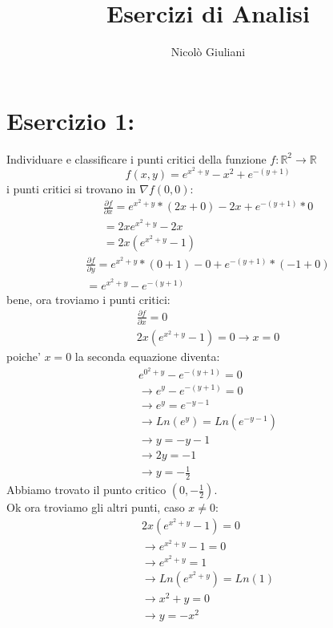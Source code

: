 \documentclass{article}
\title{Esercizi di Analisi}
\author{Nicolò Giuliani}
\date{}
\begin{document}
\maketitle
\section*{Esercizio 1:}
Individuare e classificare i punti critici della funzione $f : \mathbb{R}^2 \to \mathbb{R}$
\begin{equation*}
    f(x,y)=e^{x^2+y}-x^2+e^{-(y+1)}
\end{equation*}
i punti critici si trovano in $\nabla f(0,0)$:
\begin{align*}
    \frac{\partial f}{\partial x}=e^{x^2+y}*(2x+0)-2x+e^{-(y+1)}*0 \\
    = 2xe^{x^2+y}-2x \\
    = 2x(e^{x^2+y}-1)
\end{align*}
\begin{align*}
    \frac{\partial f}{\partial y}=e^{x^2+y}*(0+1)-0+e^{-(y+1)}*(-1+0) \\
    = e^{x^2+y} - e^{-(y+1)}
\end{align*}
bene, ora troviamo i punti critici:
\begin{align*}
    \frac{\partial f}{\partial x}=0 \\
    2x(e^{x^2+y}-1) = 0 \to x=0
\end{align*}
poiche' $x=0$ la seconda equazione diventa:
\begin{align*}
    e^{0^2+y} - e^{-(y+1)}=0 \\
    \to e^y - e^{-(y+1)}=0 \\
    \to e^y = e^{-y-1} \\
    \to Ln(e^y) = Ln(e^{-y-1}) \\
    \to y = -y -1 \\
    \to 2y = -1 \\
    \to y = -\frac{1}{2}
\end{align*}
Abbiamo trovato il punto critico $(0,-\frac{1}{2})$. 
\vspace{1em}
\\Ok ora troviamo gli altri punti, caso $x\neq 0$:
\begin{align*}
    2x(e^{x^2+y}-1) = 0 \\
    \to e^{x^2+y}-1=0 \\
    \to e^{x^2+y}=1 \\
    \to Ln(e^{x^2+y})=Ln(1) \\
    \to x^2+y=0 \\
    \to y = -x^2
\end{align*}
\end{document}
